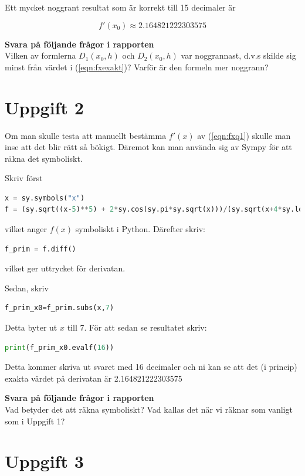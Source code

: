 \documentclass[a4paper]{article}
\begin{document}
Ett mycket noggrant resultat som är korrekt till 15 decimaler är

\begin{equation} \label{eqn:fxexakt}
  f'(x_0)\approx 2.164821222303575
\end{equation}

\textbf{Svara på följande frågor i rapporten}\\
Vilken av formlerna  \( D_1(x_0,h) \) och  \( D_2(x_0,h) \) var noggrannast,
d.v.s skilde sig minst från värdet i (\ref{eqn:fxexakt})? Varför är den formeln mer noggrann?


\section{Uppgift 2}
Om man skulle testa att manuellt bestämma \( f'(x) \) av (\ref{eqn:fxq1})
skulle man inse att det blir rätt så bökigt. Däremot kan man använda sig av Sympy för att räkna det symboliskt.

Skriv först
\begin{lstlisting}[language=Python]
x = sy.symbols("x")
f = (sy.sqrt((x-5)**5) + 2*sy.cos(sy.pi*sy.sqrt(x)))/(sy.sqrt(x+4*sy.log(x-sy.pi))-1)
\end{lstlisting}
vilket anger \( f(x) \) symboliskt i Python. Därefter skriv:

\begin{lstlisting}[language=Python]
  f_prim = f.diff()
\end{lstlisting}
vilket ger uttrycket för derivatan.

Sedan, skriv

\begin{lstlisting}[language=Python]
  f_prim_x0=f_prim.subs(x,7)
\end{lstlisting}
Detta byter ut \(x\)  till 7. För att sedan se resultatet skriv:

\begin{lstlisting}[language=Python]
  print(f_prim_x0.evalf(16))
\end{lstlisting}
Detta kommer skriva ut svaret med 16 decimaler och ni kan se
att det (i princip) exakta värdet på derivatan är 2.164821222303575


\textbf{Svara på följande frågor i rapporten}\\
Vad betyder det att räkna symboliskt?
Vad kallas det när vi räknar som vanligt som i Uppgift 1?

\newpage
\section{Uppgift 3}
\end{document}
